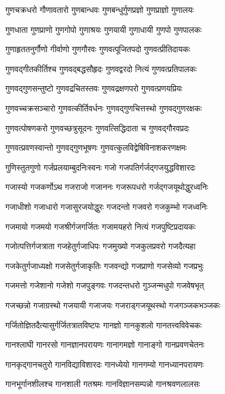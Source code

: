 \twolineshloka
{गुणचक्रधरो गौणावतारो गुणबान्धवः}%
{गुणबन्धुर्गुणप्रज्ञो गुणप्राज्ञो गुणालयः}%

\twolineshloka
{गुणधाता गुणप्राणो गुणगोपो गुणाश्रयः}%
{गुणयायी गुणाधायी गुणपो गुणपालकः}%

\twolineshloka
{गुणाहृततनुर्गौणो गीर्वाणो गुणगौरवः}%
{गुणवत्पूजितपदो गुणवत्प्रीतिदायकः}%

\twolineshloka
{गुणवद्गीतकीर्तिश्च गुणवद्बद्धसौहृदः}%
{गुणवद्वरदो नित्यं गुणवत्प्रतिपालकः}%

\twolineshloka
{गुणवद्गुणसन्तुष्टो गुणवद्रचितस्तवः}%
{गुणवद्रक्षणपरो गुणवत्प्रणयप्रियः}%

\twolineshloka
{गुणवच्चक्रसञ्चारो गुणवत्कीर्तिवर्धनः}%
{गुणवद्गुणचित्तस्थो गुणवद्गुणरक्षकः}%

\twolineshloka
{गुणवत्पोषणकरो गुणवच्छत्रुसूदनः}%
{गुणवत्सिद्धिदाता च गुणवद्गौरवप्रदः}%

\twolineshloka
{गुणवत्प्रवणस्वान्तो गुणवद्गुणभूषणः}%
{गुणवत्कुलविद्वेषिविनाशकरणक्षमः}%

\twolineshloka
{गुणिस्तुतगुणो गर्जप्रलयाम्बुदनिःस्वनः}%
{गजो गजपतिर्गर्जद्गजयुद्धविशारदः}%

\twolineshloka
{गजास्यो गजकर्णोऽथ गजराजो गजाननः}%
{गजरूपधरो गर्जद्गजयूथोद्धुरध्वनिः}%

\twolineshloka
{गजाधीशो गजाधारो गजासुरजयोद्धुरः}%
{गजदन्तो गजवरो गजकुम्भो गजध्वनिः}%

\twolineshloka
{गजमायो गजमयो गजश्रीर्गजगर्जितः}%
{गजामयहरो नित्यं गजपुष्टिप्रदायकः}%

\twolineshloka
{गजोत्पत्तिर्गजत्राता गजहेतुर्गजाधिपः}%
{गजमुख्यो गजकुलप्रवरो गजदैत्यहा}%

\twolineshloka
{गजकेतुर्गजाध्यक्षो गजसेतुर्गजाकृतिः}%
{गजवन्द्यो गजप्राणो गजसेव्यो गजप्रभुः}%

\twolineshloka
{गजमत्तो गजेशानो गजेशो गजपुङ्गवः}%
{गजदन्तधरो गुञ्जन्मधुपो गजवेषभृत्}%

\twolineshloka
{गजच्छन्नो गजाग्रस्थो गजयायी गजाजयः}%
{गजराड्गजयूथस्थो गजगञ्जकभञ्जकः}%

\twolineshloka
{गर्जितोज्ञितदैत्यासुर्गर्जितत्रातविष्टपः}%
{गानज्ञो गानकुशलो गानतत्त्वविवेचकः}%

\twolineshloka
{गानश्लाघी गानरसो गानज्ञानपरायणः}%
{गानागमज्ञो गानाङ्गो गानप्रवणचेतनः}%

\twolineshloka
{गानकृद्गानचतुरो गानविद्याविशारदः}%
{गानध्येयो गानगम्यो गानध्यानपरायणः}%

\twolineshloka
{गानभूर्गानशीलश्च गानशाली गतश्रमः}%
{गानविज्ञानसम्पन्नो गानश्रवणलालसः}%


